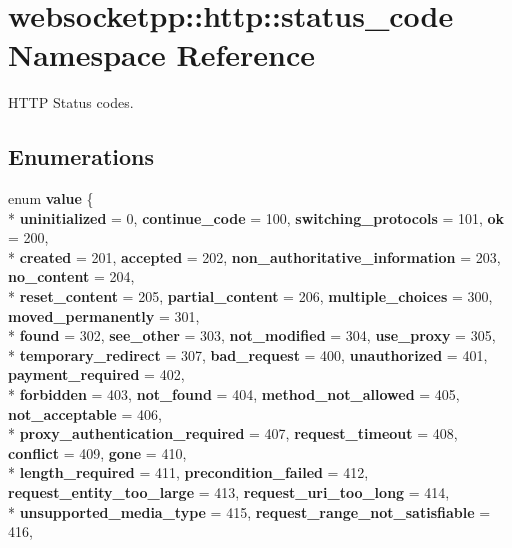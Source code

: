 \hypertarget{namespacewebsocketpp_1_1http_1_1status__code}{}\section{websocketpp\+:\+:http\+:\+:status\+\_\+code Namespace Reference}
\label{namespacewebsocketpp_1_1http_1_1status__code}


H\+T\+TP Status codes.  


\subsection*{Enumerations}
\begin{DoxyCompactItemize}
\item 
enum {\bfseries value} \{ \\*
{\bfseries uninitialized} = 0, 
{\bfseries continue\+\_\+code} = 100, 
{\bfseries switching\+\_\+protocols} = 101, 
{\bfseries ok} = 200, 
\\*
{\bfseries created} = 201, 
{\bfseries accepted} = 202, 
{\bfseries non\+\_\+authoritative\+\_\+information} = 203, 
{\bfseries no\+\_\+content} = 204, 
\\*
{\bfseries reset\+\_\+content} = 205, 
{\bfseries partial\+\_\+content} = 206, 
{\bfseries multiple\+\_\+choices} = 300, 
{\bfseries moved\+\_\+permanently} = 301, 
\\*
{\bfseries found} = 302, 
{\bfseries see\+\_\+other} = 303, 
{\bfseries not\+\_\+modified} = 304, 
{\bfseries use\+\_\+proxy} = 305, 
\\*
{\bfseries temporary\+\_\+redirect} = 307, 
{\bfseries bad\+\_\+request} = 400, 
{\bfseries unauthorized} = 401, 
{\bfseries payment\+\_\+required} = 402, 
\\*
{\bfseries forbidden} = 403, 
{\bfseries not\+\_\+found} = 404, 
{\bfseries method\+\_\+not\+\_\+allowed} = 405, 
{\bfseries not\+\_\+acceptable} = 406, 
\\*
{\bfseries proxy\+\_\+authentication\+\_\+required} = 407, 
{\bfseries request\+\_\+timeout} = 408, 
{\bfseries conflict} = 409, 
{\bfseries gone} = 410, 
\\*
{\bfseries length\+\_\+required} = 411, 
{\bfseries precondition\+\_\+failed} = 412, 
{\bfseries request\+\_\+entity\+\_\+too\+\_\+large} = 413, 
{\bfseries request\+\_\+uri\+\_\+too\+\_\+long} = 414, 
\\*
{\bfseries unsupported\+\_\+media\+\_\+type} = 415, 
{\bfseries request\+\_\+range\+\_\+not\+\_\+satisfiable} = 416, 

\end{DoxyCompactItemize}
